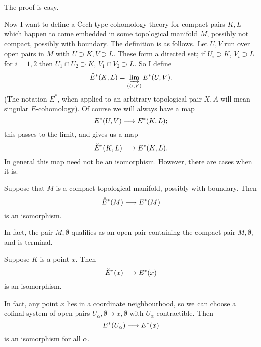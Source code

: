 \documentclass[../main]{subfiles}
\begin{document}
The proof is easy.

Now I want to define a \v{C}ech-type cohomology theory  for compact pairs $K,L$ which happen to come embedded in some topological manifold $M$, possibly not compact, possibly with boundary. The definition is as follows. Let $U,V$ run over open pairs in $M$ with $U \supset K, V \supset L$. These form a directed set; if $U_i \supset K$, $V_i \supset L$ for $i=1,2$ then $U_1 \cap U_2 \supset K$, $V_1 \cap V_2 \supset L$. So I define
\[\check{E}^*(K,L) = \varinjlim_{(U,V)} E^*(U,V).\]
(The notation $E^*$, when applied to an arbitrary topological pair $X,A$ will mean singular $E$-cohomology). Of course we will always have a map 
\[E^*(U,V) \longrightarrow E^*(K,L);\]
this passes to the limit, and gives us a map
\[\check{E}^*(K,L) \longrightarrow E^*(K,L).\]
In general this map need not be an isomorphism. However, there are cases when it is.
\begin{examples}[i]
Suppose that $M$ is a compact topological manifold, possibly with boundary. Then 
\[\check{E}^*(M) \longrightarrow E^*(M)\]
is an isomorphism.
\end{examples}
In fact, the pair $M,\emptyset$ qualifies as an open pair containing the compact pair $M,\emptyset$, and is terminal.
\begin{examples}[ii]
Suppose $K$ is a point $x$. Then 
\[\check{E}^*(x) \longrightarrow E^*(x)\]
is an isomorphism.
\end{examples}

In fact, any point $x$ lies in a coordinate neighbourhood, so we can choose a cofinal system of open pairs $U_\alpha, \emptyset \supset x, \emptyset$ with $U_\alpha$ contractible. Then 
\[E^*(U_\alpha) \longrightarrow E^*(x)\]
is an isomorphism for all $\alpha$.
\end{document}

